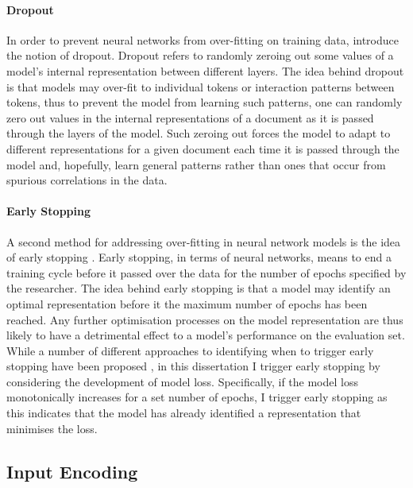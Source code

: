\paragraph{Dropout} In order to prevent neural networks from over-fitting on training data, \citet{Dropout paper} introduce the notion of dropout. Dropout refers to randomly zeroing out some values of a model's internal representation between different layers. The idea behind dropout is that models may over-fit to individual tokens or interaction patterns between tokens, thus to prevent the model from learning such patterns, one can randomly zero out values in the internal representations of a document as it is passed through the layers of the model.
Such zeroing out forces the model to adapt to different representations for a given document each time it is passed through the model and, hopefully, learn general patterns rather than ones that occur from spurious correlations in the data.

\paragraph{Early Stopping} A second method for addressing over-fitting in neural network models is the idea of early stopping \citep{Early stopping papers}. Early stopping, in terms of neural networks, means to end a training cycle before it passed over the data for the number of epochs specified by the researcher. The idea behind early stopping is that a model may identify an optimal representation before it the maximum number of epochs has been reached. Any further optimisation processes on the model representation are thus likely to have a detrimental effect to a model's performance on the evaluation set.
While a number of different approaches to identifying when to trigger early stopping have been proposed \citep{early stopping papers}, in this dissertation I trigger early stopping by considering the development of model loss. Specifically, if the model loss monotonically increases for a set number of epochs, I trigger early stopping as this indicates that the model has already identified a representation that minimises the loss.

\subsection{Input Encoding}

